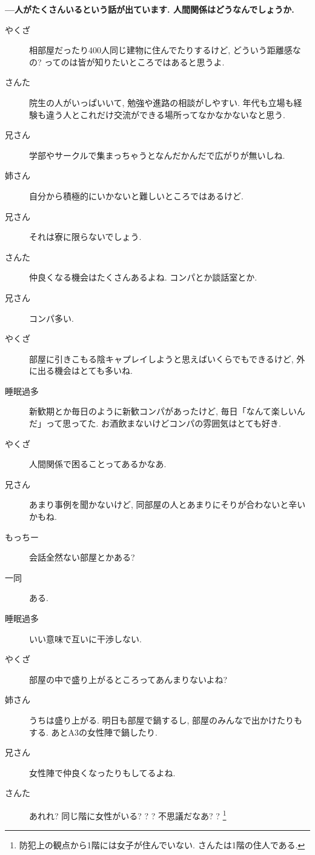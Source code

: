 \documentclass[10pt,b5jsbook,dvips,dvipdfmx,openany]{jsbook}
\theoremstyle{definition}
\begin{document}
\begin{multicols}{2}
		\textbf{---人がたくさんいるという話が出ています. 人間関係はどうなんでしょうか. }
		\begin{description}
		\item[やくざ]相部屋だったり400人同じ建物に住んでたりするけど, どういう距離感なの? ってのは皆が知りたいところではあると思うよ. 
		\item[さんた]院生の人がいっぱいいて, 勉強や進路の相談がしやすい. 年代も立場も経験も違う人とこれだけ交流ができる場所ってなかなかないなと思う. 
		\item[兄さん]学部やサークルで集まっちゃうとなんだかんだで広がりが無いしね. 
		\item[姉さん]自分から積極的にいかないと難しいところではあるけど. 
		\item[兄さん]それは寮に限らないでしょう. 
		\item[さんた]仲良くなる機会はたくさんあるよね. コンパとか談話室とか. 
		\item[兄さん]コンパ多い. 
		\item[やくざ]部屋に引きこもる陰キャプレイしようと思えばいくらでもできるけど, 外に出る機会はとても多いね. 
		\item[睡眠過多]新歓期とか毎日のように新歓コンパがあったけど, 毎日「なんて楽しいんだ」って思ってた. お酒飲まないけどコンパの雰囲気はとても好き. 
		\item[やくざ]人間関係で困ることってあるかなあ. 
		\item[兄さん]あまり事例を聞かないけど, 同部屋の人とあまりにそりが合わないと辛いかもね. 
		\item[もっちー]会話全然ない部屋とかある? 
		\item[ 一同 ]ある. 
		\item[睡眠過多]いい意味で互いに干渉しない. 
		\item[やくざ]部屋の中で盛り上がるところってあんまりないよね? 
		\item[姉さん]うちは盛り上がる. 明日も部屋で鍋するし, 部屋のみんなで出かけたりもする. あとA3の女性陣で鍋したり. 
		\item[兄さん]女性陣で仲良くなったりもしてるよね. 
		\item[さんた]あれれ? 同じ階に女性がいる? ? ? 不思議だなあ? ? \footnote{防犯上の観点から1階には女子が住んでいない. さんたは1階の住人である. }

\end{description}
\end{multicols}
\end{document}
